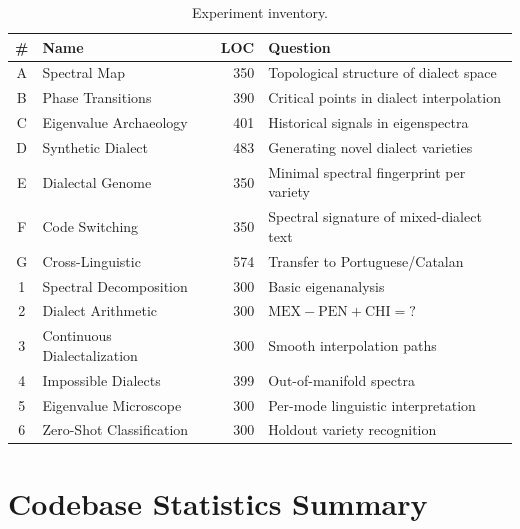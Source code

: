 \documentclass[11pt,a4paper]{article}
\begin{document}
\begin{table}[H]
\centering
\caption{Experiment inventory.}
\small
\begin{tabular}{@{}clrl@{}}
\toprule
\textbf{\#} & \textbf{Name} & \textbf{LOC} & \textbf{Question} \\
\midrule
A & Spectral Map & 350 & Topological structure of dialect space \\
B & Phase Transitions & 390 & Critical points in dialect interpolation \\
C & Eigenvalue Archaeology & 401 & Historical signals in eigenspectra \\
D & Synthetic Dialect & 483 & Generating novel dialect varieties \\
E & Dialectal Genome & 350 & Minimal spectral fingerprint per variety \\
F & Code Switching & 350 & Spectral signature of mixed-dialect text \\
G & Cross-Linguistic & 574 & Transfer to Portuguese/Catalan \\
1 & Spectral Decomposition & 300 & Basic eigenanalysis \\
2 & Dialect Arithmetic & 300 & $\text{MEX} - \text{PEN} + \text{CHI} = ?$ \\
3 & Continuous Dialectalization & 300 & Smooth interpolation paths \\
4 & Impossible Dialects & 399 & Out-of-manifold spectra \\
5 & Eigenvalue Microscope & 300 & Per-mode linguistic interpretation \\
6 & Zero-Shot Classification & 300 & Holdout variety recognition \\
\bottomrule
\end{tabular}
\end{table}


\section{Codebase Statistics Summary}
\end{document}
